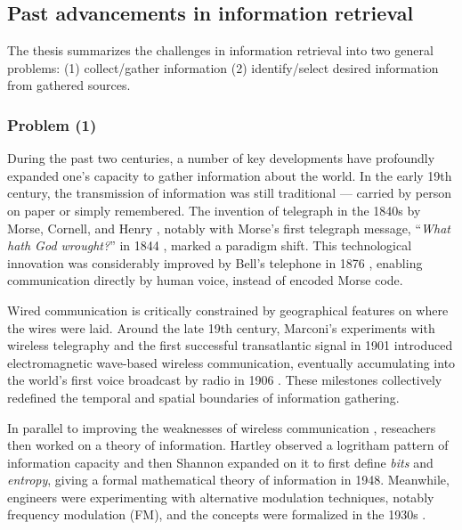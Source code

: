 \documentclass[final-report]{report-template}
\begin{document}
\subsection{Past advancements in information retrieval} 
\label{sec.info.ret.history}
The thesis summarizes the challenges in information retrieval into two general
problems: (1) collect/gather information (2) identify/select desired
information from gathered sources.

\subsubsection{Problem (1)}
During the past two centuries, a number of key developments have profoundly
expanded one's capacity to gather information about the world. In
the early 19th century, the transmission of information was still traditional
--- carried by person on paper or simply remembered. The invention of
telegraph in the 1840s by Morse, Cornell, and Henry \cite{history.telegraph.1,
history.telegraph.2}, notably with Morse's first telegraph message,
``\emph{What hath God wrought?}'' in 1844 \cite{first.telegraph.msg}, marked a
paradigm shift. This technological innovation was considerably improved by
Bell's telephone in 1876 \cite{history.telephone.1, history.telephone.2},
enabling communication directly by human voice, instead of encoded Morse code.

Wired communication is critically constrained by geographical
features on where the wires were laid. Around the late 19th century, 
Marconi's experiments with wireless telegraphy \cite{history.wireless.1} and
the first successful transatlantic signal in 1901
\cite{history.first.atlantic.broadcast} introduced electromagnetic wave-based
wireless communication, eventually accumulating into the world's first voice
broadcast by radio in 1906 \cite{first.voice.broadcast}. These milestones
collectively redefined the temporal and spatial boundaries of information
gathering.

In parallel to improving the weaknesses of wireless communication
\cite{wireless.weakness.1, wireless.weakness.2, wireless.weakness.3},
reseachers then worked on a theory of information.
Hartley observed a logritham pattern of information capacity
\cite{hartley.log.information} and then Shannon expanded on it to first define
\emph{bits} and \emph{entropy}, giving a formal mathematical theory of
information \cite{shannon.theory.communication} in 1948. Meanwhile,
engineers were experimenting with alternative modulation techniques, notably
frequency modulation (FM), and the concepts were formalized in the 1930s
\cite{history.modulation}. 
\end{document}
